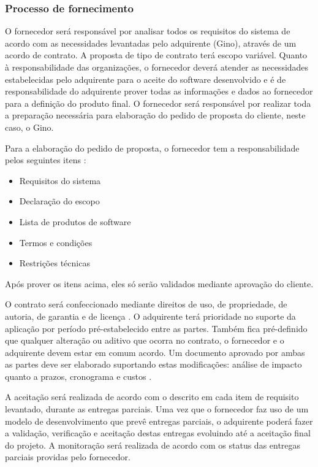 \subsubsection{\large{Processo de fornecimento}}
\label{sec:fornecimento}

O fornecedor será responsável por analisar todos os requisitos do sistema de acordo com as necessidades levantadas pelo adquirente (Gino), através de um acordo de contrato. A proposta de tipo de contrato terá escopo variável. Quanto à responsabilidade das organizações, o fornecedor deverá atender as necessidades estabelecidas pelo adquirente para o aceite do software desenvolvido e é de responsabilidade do adquirente prover todas as informações e dados ao fornecedor para a definição do produto final.
O fornecedor será responsável por realizar toda a preparação necessária para elaboração do pedido de proposta do cliente, neste caso, o Gino.

Para a elaboração do pedido de proposta, o fornecedor tem a responsabilidade pelos seguintes itens \cite{iso12207:95}:
\begin{itemize}
  \item Requisitos do sistema
  \item Declaração do escopo
  \item Lista de produtos de software
  \item Termos e condições
  \item Restrições técnicas
\end{itemize}

Após prover os itens acima, eles só serão validados mediante aprovação do cliente.

O contrato será confeccionado mediante direitos de uso, de propriedade, de autoria, de garantia e de licença \cite{iso12207:95}. O adquirente terá prioridade no suporte da aplicação por período pré-estabelecido entre as partes. Também fica pré-definido que qualquer alteração ou aditivo que ocorra no contrato, o fornecedor e o adquirente devem estar em comum acordo. Um documento aprovado por ambas as partes deve ser elaborado suportando estas modificações: análise de impacto quanto a prazos, cronograma e custos \cite{iso12207:95}.

A aceitação será realizada de acordo com o descrito em cada item de requisito levantado, durante as entregas parciais. Uma vez que o fornecedor faz uso de um modelo de desenvolvimento que prevê entregas parciais, o adquirente poderá fazer a validação, verificação e aceitação destas entregas evoluindo até a aceitação final do projeto. A monitoração será realizada de acordo com os status das entregas parciais providas pelo fornecedor. 

